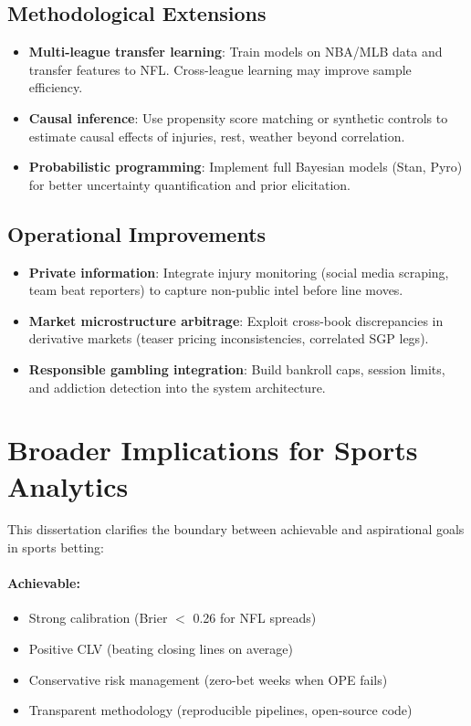 \subsection{Methodological Extensions}
\begin{itemize}
  \item \textbf{Multi-league transfer learning}: Train models on NBA/MLB data and transfer features to NFL. Cross-league learning may improve sample efficiency.
  \item \textbf{Causal inference}: Use propensity score matching or synthetic controls to estimate causal effects of injuries, rest, weather beyond correlation.
  \item \textbf{Probabilistic programming}: Implement full Bayesian models (Stan, Pyro) for better uncertainty quantification and prior elicitation.
\end{itemize}

\subsection{Operational Improvements}
\begin{itemize}
  \item \textbf{Private information}: Integrate injury monitoring (social media scraping, team beat reporters) to capture non-public intel before line moves.
  \item \textbf{Market microstructure arbitrage}: Exploit cross-book discrepancies in derivative markets (teaser pricing inconsistencies, correlated SGP legs).
  \item \textbf{Responsible gambling integration}: Build bankroll caps, session limits, and addiction detection into the system architecture.
\end{itemize}



\section{Broader Implications for Sports Analytics}

This dissertation clarifies the boundary between achievable and aspirational goals in sports betting:

\paragraph{Achievable:}
\begin{itemize}
  \item Strong calibration (Brier $<$ 0.26 for NFL spreads)
  \item Positive CLV (beating closing lines on average)
  \item Conservative risk management (zero-bet weeks when OPE fails)
  \item Transparent methodology (reproducible pipelines, open-source code)
\end{itemize}

